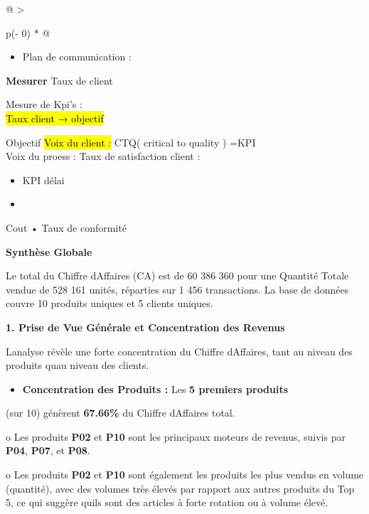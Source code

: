 \documentclass[
]{article}
\begin{document}
\begin{longtable}[]{@{}
  >{\raggedright\arraybackslash}p{(\columnwidth - 0\tabcolsep) * }@{}}
\toprule\noalign{}
\begin{minipage}[b]{\linewidth}\raggedright
\begin{itemize}
\item Plan de communication :\\
\end{itemize}
\textbf{Mesurer} Taux de client

Mesure de Kpi's :\\
\hl{Taux client → objectif}

Objectif \hl{Voix du client :} CTQ( critical to quality ) =KPI\\
Voix du proess : Taux de satisfaction client :\\
\begin{itemize}
\item KPI délai\\
\item \\
\end{itemize}
Cout • Taux de conformité

\textbf{Synthèse Globale}

Le total du Chiffre d\textquotesingle Affaires (CA) est de 60 386 360
pour une Quantité Totale vendue de 528 161 unités, réparties sur 1 456
transactions. La base de données couvre 10 produits uniques et 5 clients
uniques.

\textbf{1. Prise de Vue Générale et Concentration des Revenus}

L\textquotesingle analyse révèle une forte concentration du Chiffre
d\textquotesingle Affaires, tant au niveau des produits
qu\textquotesingle au niveau des clients.

\begin{itemize}
\item \textbf{Concentration des Produits :} Les \textbf{5 premiers produits}
\end{itemize}
(sur 10) génèrent \textbf{67.66\%} du Chiffre d\textquotesingle Affaires
total.

o Les produits \textbf{P02} et \textbf{P10} sont les principaux moteurs
de revenus, suivis par \textbf{P04}, \textbf{P07}, et \textbf{P08}.

o Les produits \textbf{P02} et \textbf{P10} sont également les produits
les plus vendus en volume (quantité), avec des volumes très élevés par
rapport aux autres produits du Top 5, ce qui suggère
qu\textquotesingle ils sont des articles à forte rotation ou à volume
élevé.


\end{minipage}
\end{longtable}
\end{document}
